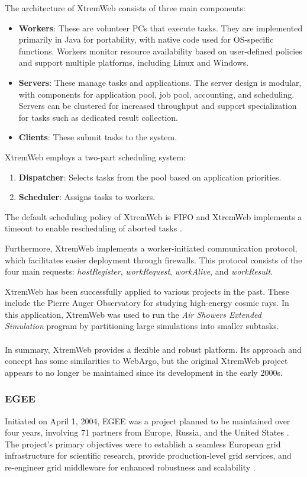 The architecture of XtremWeb consists of three main components:
\begin{itemize}
  \item \textbf{Workers}: These are volunteer \ac{PC}s that execute tasks. They are implemented primarily in Java for portability, with native code used for \ac{OS}-specific functions. Workers monitor resource availability based on user-defined policies and support multiple platforms, including Linux and Windows.
  \item \textbf{Servers}: These manage tasks and applications. The server design is modular, with components for application pool, job pool, accounting, and scheduling. Servers can be clustered for increased throughput and support specialization for tasks such as dedicated result collection.
  \item \textbf{Clients}: These submit tasks to the system.
\end{itemize}
XtremWeb employs a two-part scheduling system:
\begin{enumerate}
  \item \textbf{Dispatcher}: Selects tasks from the pool based on application priorities.
  \item \textbf{Scheduler}: Assigns tasks to workers.
\end{enumerate}
The default scheduling policy of XtremWeb is \ac{FIFO} and XtremWeb implements a timeout to enable rescheduling of aborted tasks \cite{relatedwork:xtremweb}.

Furthermore, XtremWeb implements a worker-initiated communication protocol, which facilitates easier deployment through firewalls. This protocol consists of the four main requests: \emph{hostRegister}, \emph{workRequest}, \emph{workAlive}, and \emph{workResult}. \cite{relatedwork:xtremweb}

XtremWeb has been successfully applied to various projects in the past. These include the Pierre Auger Observatory for studying high-energy cosmic rays. In this application, XtremWeb was used to run the \emph{Air Showers Extended Simulation} program by partitioning large simulations into smaller subtasks. \cite{relatedwork:xtremweb}
\\~\\
In summary, XtremWeb provides a flexible and robust platform. Its approach and concept has some similarities to WebArgo, but the original XtremWeb project appears to no longer be maintained since its development in the early 2000s.

\subsubsection{EGEE}
\label{subsec:background:related_work:egee}
Initiated on April 1, 2004, \ac{EGEE} was a project planned to be maintained over four years, involving 71 partners from Europe, Russia, and the United States \cite{relatedwork:egee}. The project's primary objectives were to establish a seamless European grid infrastructure for scientific research, provide production-level grid services, and re-engineer grid middleware for enhanced robustness and scalability \cite{relatedwork:egee}.

